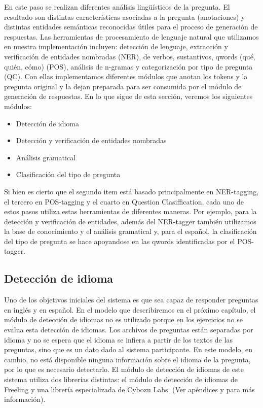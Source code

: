 En este paso se realizan diferentes análisis lingüísticos de la pregunta. El resultado son distintas características asociadas a la pregunta (anotaciones) y distintas entidades semánticas reconocidas útiles para el proceso de generación de respuestas. 
Las herramientas de procesamiento de lenguaje natural que utilizamos en nuestra implementación incluyen: detección de lenguaje, extracción y verificación de entidades nombradas (NER), de verbos, sustantivos, qwords (qué, quién, cómo) (POS), análisis de n-gramas y categorización por tipo de pregunta (QC).
Con ellas implementamos diferentes módulos que anotan los tokens y la pregunta original y la dejan preparada para ser consumida por el módulo de generación de respuestas. En lo que sigue de esta sección, veremos los siguientes módulos:

\begin{itemize}
\item Detección de idioma 
\item Detección y verificación de entidades nombradas
\item Análisis gramatical
\item Clasificación del tipo de pregunta
\end{itemize}

Si bien es cierto que el segundo item está basado principalmente en NER-tagging, el tercero en POS-tagging y el cuarto en Question Clasiffication, 
cada uno de estos pasos utiliza estas herramientas de diferentes maneras. Por ejemplo, para la detección y verificación de entidades, además del NER-tagger también utilizamos la base de conocimiento y el análisis gramatical y, para el español, la clasificación del tipo de pregunta se hace apoyandose en las qwords identificadas por el POS-tagger.

\subsection{Detección de idioma}

Uno de los objetivos iniciales del sistema es que sea capaz de responder preguntas en inglés y en español. En el modelo que describiremos en el próximo capítulo, el módulo de detección de idiomas no es utilizado porque en los ejercicios no se evalua esta detección de idiomas. Los archivos de preguntas están separadas por idioma y no se espera que el idioma se infiera a partir de los textos de las preguntas, sino que es un dato dado al sistema participante. En este modelo, en cambio, no está disponible ninguna información sobre el idioma de la pregunta, por lo que es necesario detectarlo. El módulo de detección de idiomas de este sistema utiliza dos librerías distintas: el módulo de detección de idiomas de Freeling y una librería especializada de Cybozu Labs. (Ver apéndices  y  para más información).

